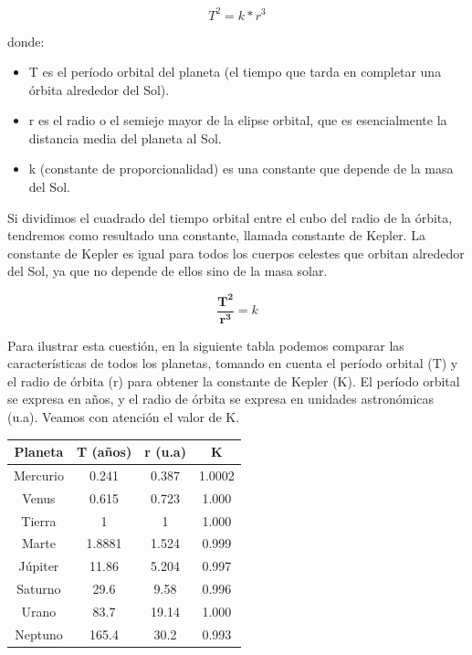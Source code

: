 \documentclass{article}
\begin{document}
	\begin{equation*}
		T^2 = k * r^3
	\end{equation*}
	
	 donde:
	
	\begin{itemize}
		\item T es el período orbital del planeta (el tiempo que tarda en completar una órbita alrededor del Sol).
		\item r es el radio o el semieje mayor de la elipse orbital, que es esencialmente la distancia media del planeta al Sol.
		\item k (constante de proporcionalidad) es una constante que depende de la masa del Sol. 
	\end{itemize}
	
	Si dividimos el cuadrado del tiempo orbital entre el cubo del radio de la órbita, tendremos como resultado una constante, llamada constante de Kepler. La constante de Kepler es igual para todos los cuerpos celestes que orbitan alrededor del Sol, ya que no depende de ellos sino de la masa solar.
	
	\begin{equation*}
		\frac{\mathbf{T^2}}{\mathbf{r^3}} = k
	\end{equation*}
	
	Para ilustrar esta cuestión, en la siguiente tabla podemos comparar las características de todos los planetas, tomando en cuenta el período orbital (T) y el radio de órbita (r) para obtener la constante de Kepler (K). El período orbital se expresa en años, y el radio de órbita se expresa en unidades astronómicas (u.a). Veamos con atención el valor de K.
	
	\begin{table}[H]
		\centering
		\begin{tabular}{|c|c|c|c|} 
			\hline Planeta & T (años) & r (u.a) & K \\ 
			\hline Mercurio & 0.241 & 0.387 & 1.0002 \\ 
			\hline Venus & 0.615 & 0.723 & 1.000 \\ 
			\hline Tierra & 1 & 1 & 1.000 \\
			\hline Marte & 1.8881 & 1.524 & 0.999 \\
			\hline Júpiter & 11.86 & 5.204 & 0.997 \\
			\hline Saturno & 29.6 & 9.58 & 0.996 \\
			\hline Urano & 83.7 & 19.14 & 1.000 \\
			\hline Neptuno & 165.4 & 30.2 & 0.993 \\
			\hline 
	   \end{tabular}
	\end{table}
	
\end{document}
